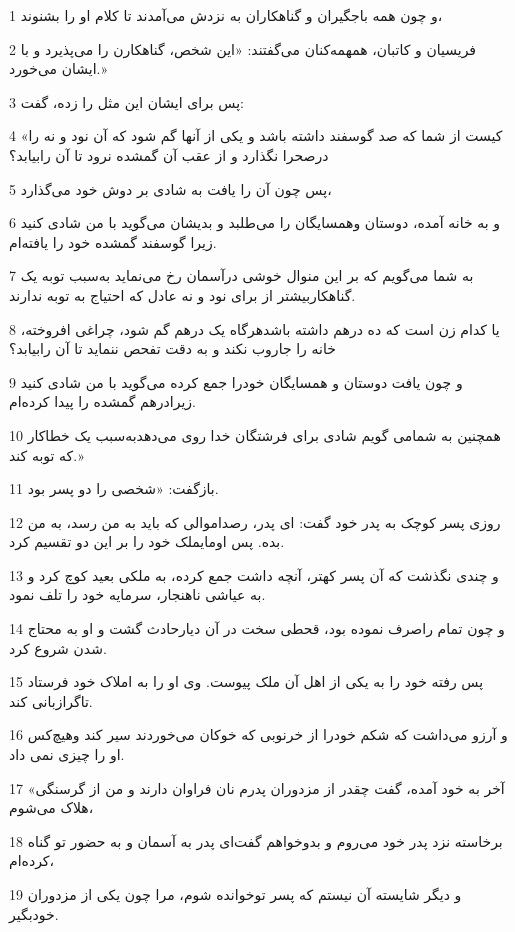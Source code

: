 \par 1 و چون همه باجگیران و گناهکاران به نزدش می‌آمدند تا کلام او را بشنوند،
\par 2 فریسیان و کاتبان، همهمه‌کنان می‌گفتند: «این شخص، گناهکارن را می‌پذیرد و با ایشان می‌خورد.»
\par 3 پس برای ایشان این مثل را زده، گفت:
\par 4 «کیست از شما که صد گوسفند داشته باشد و یکی از آنها گم شود که آن نود و نه را درصحرا نگذارد و از عقب آن گمشده نرود تا آن رابیابد؟
\par 5 پس چون آن را یافت به شادی بر دوش خود می‌گذارد،
\par 6 و به خانه آمده، دوستان وهمسایگان را می‌طلبد و بدیشان می‌گوید با من شادی کنید زیرا گوسفند گمشده خود را یافته‌ام.
\par 7 به شما می‌گویم که بر این منوال خوشی درآسمان رخ می‌نماید به‌سبب توبه یک گناهکاربیشتر از برای نود و نه عادل که احتیاج به توبه ندارند.
\par 8 یا کدام زن است که ده درهم داشته باشدهرگاه یک درهم گم شود، چراغی افروخته، خانه را جاروب نکند و به دقت تفحص ننماید تا آن رابیابد؟
\par 9 و چون یافت دوستان و همسایگان خودرا جمع کرده می‌گوید با من شادی کنید زیرادرهم گمشده را پیدا کرده‌ام.
\par 10 همچنین به شمامی گویم شادی برای فرشتگان خدا روی می‌دهدبه‌سبب یک خطاکار که توبه کند.»
\par 11 باز‌گفت: «شخصی را دو پسر بود.
\par 12 روزی پسر کوچک به پدر خود گفت: ای پدر، رصداموالی که باید به من رسد، به من بده. پس اومایملک خود را بر این دو تقسیم کرد.
\par 13 و چندی نگذشت که آن پسر کهتر، آنچه داشت جمع کرده، به ملکی بعید کوچ کرد و به عیاشی ناهنجار، سرمایه خود را تلف نمود.
\par 14 و چون تمام راصرف نموده بود، قحطی سخت در آن دیارحادث گشت و او به محتاج شدن شروع کرد.
\par 15 پس رفته خود را به یکی از اهل آن ملک پیوست. وی او را به املاک خود فرستاد تاگرازبانی کند.
\par 16 و آرزو می‌داشت که شکم خودرا از خرنوبی که خوکان می‌خوردند سیر کند وهیچ‌کس او را چیزی نمی داد.
\par 17 «آخر به خود آمده، گفت چقدر از مزدوران پدرم نان فراوان دارند و من از گرسنگی هلاک می‌شوم،
\par 18 برخاسته نزد پدر خود می‌روم و بدوخواهم گفت‌ای پدر به آسمان و به حضور تو گناه کرده‌ام،
\par 19 و دیگر شایسته آن نیستم که پسر توخوانده شوم، مرا چون یکی از مزدوران خودبگیر.

